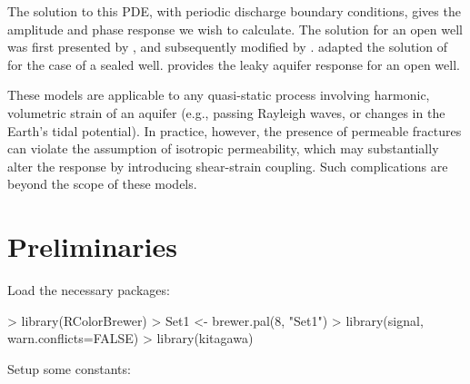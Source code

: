 \documentclass[12pt]{article}
\begin{document}
 The solution to this PDE, with periodic discharge boundary conditions,
 gives the amplitude and phase response we wish to calculate.
 The solution  for an open well was first presented by
 \citet{cooper1965}, and subsequently modified by \citet{rojstaczer1988, liu1989}.
 \citet{kitagawa2011} adapted the solution
 of \citet{hsieh1987} for the case of a sealed well. 
 \citet{wang2018} provides the leaky aquifer response for an open well.
 
 These models are applicable to any quasi-static process involving harmonic, 
 volumetric strain of an aquifer 
 (e.g., passing Rayleigh waves, or changes in the Earth's tidal potential). 
 In practice, however, the presence of permeable fractures can violate the
 assumption of isotropic permeability, which may substantially
 alter the response by introducing shear-strain coupling. Such
 complications are beyond the scope of these models.

\section{Preliminaries}


Load the necessary packages:

\begin{Schunk}
\begin{Sinput}
> library(RColorBrewer)
> Set1 <- brewer.pal(8, "Set1")
> library(signal, warn.conflicts=FALSE)
> library(kitagawa)
\end{Sinput}
\end{Schunk}

Setup some constants:

\begin{Schunk}
\end{Schunk}
\end{document}
